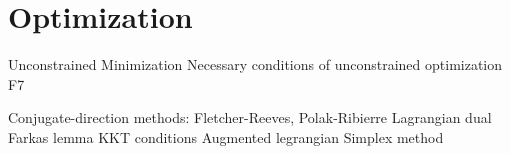 \part{Optimization}

	Unconstrained Minimization
	Necessary conditions of unconstrained optimization F7





Conjugate-direction methods: Fletcher-Reeves, Polak-Ribierre
Lagrangian dual
Farkas lemma
KKT conditions
Augmented legrangian
Simplex method

